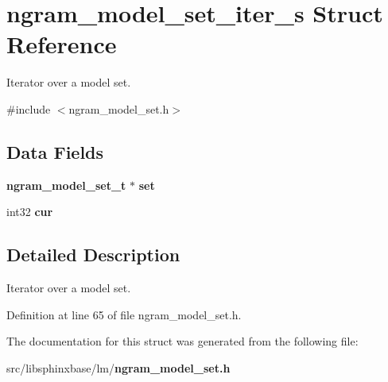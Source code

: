\section{ngram\+\_\+model\+\_\+set\+\_\+iter\+\_\+s Struct Reference}
\label{structngram__model__set__iter__s}


Iterator over a model set.  




{\ttfamily \#include $<$ngram\+\_\+model\+\_\+set.\+h$>$}

\subsection*{Data Fields}
\begin{DoxyCompactItemize}
\item 
{\bf ngram\+\_\+model\+\_\+set\+\_\+t} $\ast$ {\bfseries set}\label{structngram__model__set__iter__s_ac03199d884b9ed641141a1512f87b0cc}

\item 
int32 {\bfseries cur}\label{structngram__model__set__iter__s_afe1dd087a0beb86a29549785ab394f91}

\end{DoxyCompactItemize}


\subsection{Detailed Description}
Iterator over a model set. 

Definition at line 65 of file ngram\+\_\+model\+\_\+set.\+h.



The documentation for this struct was generated from the following file\+:\begin{DoxyCompactItemize}
\item 
src/libsphinxbase/lm/{\bf ngram\+\_\+model\+\_\+set.\+h}\end{DoxyCompactItemize}
